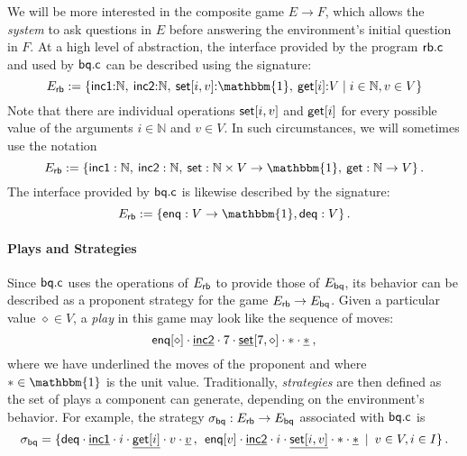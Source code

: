 \documentclass[acmsmall,review,anonymous]{acmart}\settopmatter{printfolios=true,printccs=false,printacmref=false}
\begin{document}
We will be more interested in the composite game $E \rightarrow F$,
which allows the \emph{system} to ask questions in $E$
before answering the environment's initial question in $F$.
At a high level of abstraction,
the interface provided by the program $ \mathsf{rb.c} $ %
and used by $ \mathsf{bq.c} $ %
can be described using the signature:
\[
  E_\kw{rb} := \{
    \kw{inc1} {:} \mathbb{N}, \:
    \kw{inc2} {:} \mathbb{N}, \:
    \kw{set}[i, v] {:} \mathbbm{1}, \:
    \kw{get}[i] {:} V \mid
    i \in \mathbb{N}, v \in V \}
\]
Note that there are individual operations
$ \mathsf{set} [i, v]$ and $ \mathsf{get} [i]$
for every possible value of the arguments
$i \in \mathbb{N}$ and $v \in V$.
In such circumstances,
we will sometimes use the notation
\[
  E_\kw{rb} := \{
    \kw{inc1} : \mathbb{N}, \:
    \kw{inc2} : \mathbb{N}, \:
    \kw{set} : \mathbb{N} \times V \rightarrow \mathbbm{1}, \:
    \kw{get} : \mathbb{N} \rightarrow V \}
  \,.
\]
The interface provided by $ \mathsf{bq.c} $
is likewise described by the signature:
\[
  E_\kw{rb} := \{
    \kw{enq} : V \rightarrow \mathbbm{1},
    \kw{deq} : V \}
  \,.
\]

\paragraph{Plays and Strategies}

Since $ \mathsf{bq.c} $
uses the operations of $E_{ \mathsf{rb} }$ to
provide those of $E_{ \mathsf{bq} }$,
its behavior
can be described as a proponent strategy for the game
$E_{ \mathsf{rb} } \rightarrow E_{ \mathsf{bq} }$.
Given a particular value $\diamond \in V$,
a \emph{play} in this game may look like the sequence of moves:
\[
   \mathsf{enq} [\diamond] \cdot
  \underline{ \mathsf{inc2} } \cdot
  7 \cdot
  \underline{ \mathsf{set} }[7, \diamond] \cdot
  * \cdot
  \underline*
  \:,
\]
where we have underlined the moves of the proponent
and where $* \in \mathbbm{1}$ is the unit value.
Traditionally,
\emph{strategies} are then defined as
the set of plays a component can generate,
depending on the environment's behavior.
For example,
the strategy
$\sigma_{ \mathsf{bq} } : E_{ \mathsf{rb} } \rightarrow E_{ \mathsf{bq} }$
associated with $ \mathsf{bq.c} $ is
\[
  \sigma_{ \mathsf{bq} } =
  \{ 
     \mathsf{deq}  \cdot
    \underline{ \mathsf{inc1} } \cdot
    i \cdot
    \underline{ \mathsf{get} [i]} \cdot
    v \cdot
    \underline{v} \,, \:\:
     \mathsf{enq} [v] \cdot
    \underline{ \mathsf{inc2} } \cdot
    i \cdot
    \underline{ \mathsf{set} [i, v]} \cdot
    * \cdot
    \underline*
  \:\mid\:
    v \in V, i \in I
  \}
  \,.
\]
\end{document}

